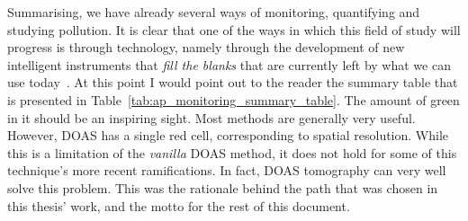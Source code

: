 Summarising, we have already several ways of monitoring, quantifying and
studying pollution. It is clear that one of the ways in which this field
of study will progress is through technology, namely through the
development of new intelligent instruments that \emph{fill the blanks}
that are currently left by what we can use today~\cite{EEA2019,
Kim2007}. At this point I would point out to the reader the summary
table that is presented in Table~\ref{tab:ap_monitoring_summary_table}.
The amount of green in it should be an inspiring sight. Most methods are
generally very useful. However, \gls{DOAS} has a single red cell,
corresponding to spatial resolution. While this is a limitation of the
\emph{vanilla} \gls{DOAS} method, it does not hold for some of this
technique's more recent ramifications. In fact, \gls{DOAS} tomography
can very well solve this problem. This was the rationale behind the path
that was chosen in this thesis' work, and the motto for the rest of this
document.

